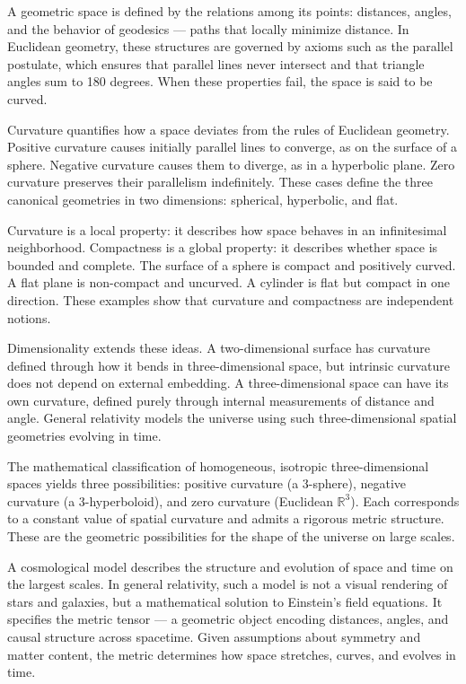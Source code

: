 A geometric space is defined by the relations among its points: distances, angles, and the behavior of geodesics — paths that locally minimize distance. In Euclidean geometry, these structures are governed by axioms such as the parallel postulate, which ensures that parallel lines never intersect and that triangle angles sum to 180 degrees. When these properties fail, the space is said to be curved.

Curvature quantifies how a space deviates from the rules of Euclidean geometry. Positive curvature causes initially parallel lines to converge, as on the surface of a sphere. Negative curvature causes them to diverge, as in a hyperbolic plane. Zero curvature preserves their parallelism indefinitely. These cases define the three canonical geometries in two dimensions: spherical, hyperbolic, and flat.

Curvature is a local property: it describes how space behaves in an infinitesimal neighborhood. Compactness is a global property: it describes whether space is bounded and complete. The surface of a sphere is compact and positively curved. A flat plane is non-compact and uncurved. A cylinder is flat but compact in one direction. These examples show that curvature and compactness are independent notions.

Dimensionality extends these ideas. A two-dimensional surface has curvature defined through how it bends in three-dimensional space, but intrinsic curvature does not depend on external embedding. A three-dimensional space can have its own curvature, defined purely through internal measurements of distance and angle. General relativity models the universe using such three-dimensional spatial geometries evolving in time.

The mathematical classification of homogeneous, isotropic three-dimensional spaces yields three possibilities: positive curvature (a 3-sphere), negative curvature (a 3-hyperboloid), and zero curvature (Euclidean $\mathbb{R}^3$). Each corresponds to a constant value of spatial curvature and admits a rigorous metric structure. These are the geometric possibilities for the shape of the universe on large scales.

A cosmological model describes the structure and evolution of space and time on the largest scales. In general relativity, such a model is not a visual rendering of stars and galaxies, but a mathematical solution to Einstein’s field equations. It specifies the metric tensor — a geometric object encoding distances, angles, and causal structure across spacetime. Given assumptions about symmetry and matter content, the metric determines how space stretches, curves, and evolves in time.

